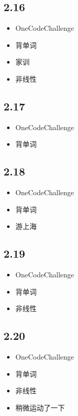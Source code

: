 \documentclass[UTF8]{ctexart}
\begin{document}
\subsection*{2.16}
\begin{itemize}
    \item OneCodeChallenge
    \item 背单词
    \item 家训
    \item 非线性
\end{itemize}

\subsection*{2.17}
\begin{itemize}
    \item OneCodeChallenge
    \item 背单词
\end{itemize}

\subsection*{2.18}
\begin{itemize}
    \item OneCodeChallenge
    \item 背单词
    \item 游上海
\end{itemize}

\subsection*{2.19}
\begin{itemize}
    \item OneCodeChallenge
    \item 背单词
    \item 非线性
\end{itemize}

\subsection*{2.20}
\begin{itemize}
    \item OneCodeChallenge
    \item 背单词
    \item 非线性
    \item 稍微运动了一下
\end{itemize}
\end{document}
